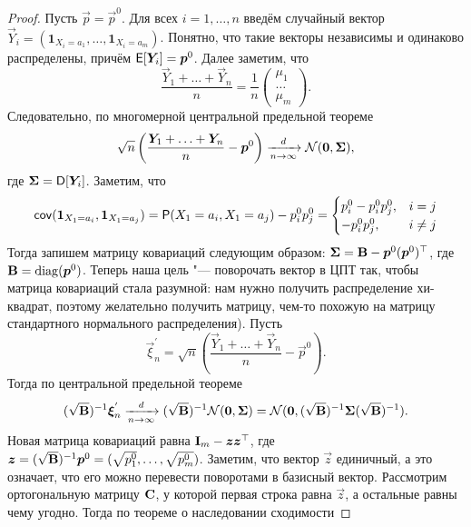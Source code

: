 \begin{proof}
	Пусть $\vec{p} = \vec{p}^{0}$. Для всех $i = 1, \ldots, n$ введём случайный вектор $\vec{Y}_{i} = (\mathbf{1}_{X_{i} = a_{1}}, \ldots, \mathbf{1}_{X_{i} = a_{m}})$. Понятно, что такие векторы независимы и одинаково распределены, причём $\operatorname{\mathsf{E}}[\bm{Y}_{i}] = \bm{p}^{0}$. Далее заметим, что
	\begin{equation}
		\frac{\vec{Y}_{1} + \ldots + \vec{Y}_{n}}{n} = \frac{1}{n}\begin{pmatrix}
			\mu_{1} \\ \ldots \\ \mu_{m}
		\end{pmatrix}.
	\end{equation}
	Следовательно, по многомерной центральной предельной теореме
	\begin{equation}
		\sqrt{n}\left(\frac{\bm{Y}_{1} + \ldots + \bm{Y}_{n}}{n} - \bm{p}^{0}\right)
		\xrightarrow[n \to \infty]{d} \mathcal{N}(\bm{0}, \mathbf{\Sigma}),
	\end{equation} 
	где $\mathbf{\Sigma} = \operatorname{\mathsf{D}}[\bm{Y}_{i}]$. Заметим, что
	\begin{equation}
		\operatorname{\mathsf{cov}}(\mathbf{1}_{X_{1} = a_{i}}, \mathbf{1}_{X_{1} = a_{j}})
		= \mathsf{P}(X_{1} = a_{i}, X_{1} = a_{j}) - p_{i}^{0}p_{j}^{0}
		= \begin{cases}
			p_{i}^{0} - p_{i}^{0}p_{j}^{0}, & i = j \\
			-p_{i}^{0}p_{j}^{0}, & i \neq j
		\end{cases}
	\end{equation}
	Тогда запишем матрицу ковариаций следующим образом: $\mathbf{\Sigma} = \mathbf{B} - \bm{p}^{0}(\bm{p}^{0})^{\top}$, где $\mathbf{B} = \operatorname{diag}(\bm{p}^{0})$. Теперь наша цель "--- поворочать вектор в ЦПТ так, чтобы матрица ковариаций стала разумной: нам нужно получить распределение хи-квадрат, поэтому желательно получить матрицу, чем-то похожую на матрицу стандартного нормального распределения). Пусть
	\begin{equation}
		\vec{\xi}_{n}^{'} = \sqrt{n}\left(\frac{\vec{Y}_{1} + \ldots + \vec{Y}_{n}}{n} - \vec{p}^{0}\right).
	\end{equation}
	Тогда по центральной предельной теореме
	\begin{equation}
		(\sqrt{\mathbf{B}})^{-1}\bm{\xi}_{n}^{'} \xrightarrow[n \to \infty]{d} (\sqrt{\mathbf{B}})^{-1}\mathcal{N}(\bm{0}, \mathbf{\Sigma}) = \mathcal{N}(\bm{0}, (\sqrt{\mathbf{B}})^{-1}\mathbf{\Sigma}(\sqrt{\mathbf{B}})^{-1}).
	\end{equation}
	Новая матрица ковариаций равна $\mathbf{I}_{m} - \bm{z}\bm{z}^{\top}$, где $\bm{z} = (\sqrt{\mathbf{B}})^{-1}\bm{p}^{0} = (\sqrt{p_{1}^{0}}, \ldots, \sqrt{p_{m}^{0}})$. Заметим, что вектор $\vec{z}$ единичный, а это означает, что его можно перевести поворотами в базисный вектор. Рассмотрим ортогональную матрицу $\mathbf{C}$, у которой первая строка равна $\vec{z}$, а остальные равны чему угодно. Тогда по теореме о наследовании сходимости

\end{proof}
